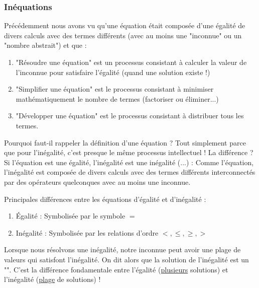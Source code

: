	 \subsubsection{Inéquations}
	 Précédemment nous avons vu qu'une équation était composée d'une égalité de divers calculs avec des termes différents (avec au moins une "inconnue" ou un "nombre abstrait") et que :
 	\begin{enumerate}
 	  \item "Résoudre une équation" est un processus consistant à calculer la valeur de l'inconnue pour satisfaire l'égalité (quand une solution existe !)
 	  
 	  \item "Simplifier une équation" est le processus consistant à minimiser mathématiquement le nombre de termes (factoriser ou éliminer...)
 	  
 	  \item "Développer une équation" est le processus consistant à distribuer tous les termes.
 	\end{enumerate}
 	Pourquoi faut-il rappeler la définition d'une équation ? Tout simplement parce que pour l'inégalité, c'est presque le même processus intellectuel ! La différence ? Si l'équation est une égalité, l'inégalité est une inégalité (...) : Comme l'équation, l'inégalité est composée de divers calculs avec des termes différents interconnectés par des opérateurs quelconques avec au moins une inconnue.
	
	Principales différences entre les équations d'égalité et d'inégalité :
	
	\begin{enumerate}
		\item Égalité : Symbolisée par le symbole $=$
		
		\item Inégalité : Symbolisée par les relations d'ordre $<, \leq, \geq, >$
	\end{enumerate}
	
	Lorsque nous résolvons une inégalité, notre inconnue peut avoir une plage de valeurs qui satisfont l'inégalité. On dit alors que la solution de l'inégalité est un "". C'est la différence fondamentale entre l'égalité (\underline{plusieurs} solutions) et l'inégalité (\underline{plage} de solutions) !
	
